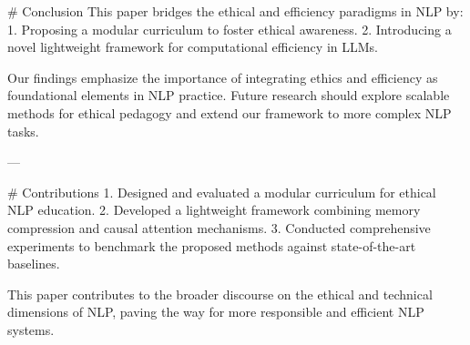 # Conclusion  
This paper bridges the ethical and efficiency paradigms in NLP by:  
1. Proposing a modular curriculum to foster ethical awareness.  
2. Introducing a novel lightweight framework for computational efficiency in LLMs.  

Our findings emphasize the importance of integrating ethics and efficiency as foundational elements in NLP practice. Future research should explore scalable methods for ethical pedagogy and extend our framework to more complex NLP tasks.

---

# Contributions  
1. Designed and evaluated a modular curriculum for ethical NLP education.  
2. Developed a lightweight framework combining memory compression and causal attention mechanisms.  
3. Conducted comprehensive experiments to benchmark the proposed methods against state-of-the-art baselines.  

This paper contributes to the broader discourse on the ethical and technical dimensions of NLP, paving the way for more responsible and efficient NLP systems.  